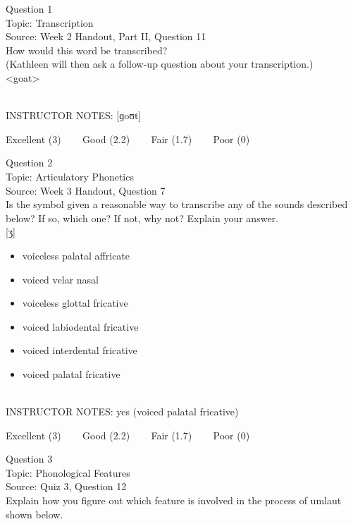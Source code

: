 \documentclass[12pt]{article}
\begin{document}
{\large Question 1}\\

Topic: Transcription\\
Source: Week 2 Handout, Part II, Question 11\\

How would this word be transcribed?\\ (Kathleen will then ask a follow-up question about your transcription.)\\

<goat>


~\\
INSTRUCTOR NOTES: [ɡoʊt]


\vfill
Excellent (3) ~~~ Good (2.2) ~~~ Fair (1.7) ~~~ Poor (0)
\newpage

{\large Question 2}\\

Topic: Articulatory Phonetics\\
Source: Week 3 Handout, Question 7\\

Is the symbol given a reasonable way to transcribe any of the sounds described below? If so, which one? If not, why not? Explain your answer.\\

{[ʒ]}

\begin{itemize} \item voiceless palatal affricate \item voiced velar nasal \item voiceless glottal fricative \item voiced labiodental fricative \item voiced interdental fricative \item voiced palatal fricative \end{itemize}


~\\
INSTRUCTOR NOTES: yes (voiced palatal fricative)


\vfill
Excellent (3) ~~~ Good (2.2) ~~~ Fair (1.7) ~~~ Poor (0)
\newpage

{\large Question 3}\\

Topic: Phonological Features\\
Source: Quiz 3, Question 12\\

Explain how you figure out which feature is involved in the process of umlaut shown below.\\
\end{document}
